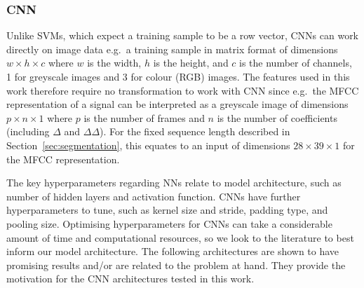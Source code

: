 \subsubsection{CNN}\label{sssec:method:cnn}

Unlike SVMs, which expect a training sample to be a row vector, CNNs can work
directly on image data e.g.\ a training sample in matrix format of dimensions
$w \times h \times c$ where $w$ is the width, $h$ is the height, and $c$ is the
number of channels, 1 for greyscale images and 3 for colour (RGB) images. The
features used in this work therefore require no transformation to work with CNN
since e.g.\ the MFCC representation of a signal can be interpreted as a
greyscale image of dimensions $p \times n \times 1$ where $p$ is the number of
frames and $n$ is the number of coefficients (including $\Delta$ and
$\Delta\Delta$). For the fixed sequence length described in
Section~\ref{sec:segmentation}, this equates to an input of dimensions $28
\times 39 \times 1$ for the MFCC representation.

The key hyperparameters regarding NNs relate to model architecture, such as
number of hidden layers and activation function. CNNs have further
hyperparameters to tune, such as kernel size and stride, padding type, and
pooling size. Optimising hyperparameters for CNNs can take a
considerable amount of time and computational resources, so we look to the
literature to best inform our model architecture. The following architectures are
shown to have promising results and/or are related to the problem at hand. They
provide the motivation for the CNN architectures tested in this work.

